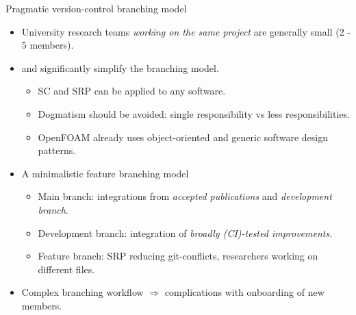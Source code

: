 \documentclass[
	ngerman,%
	aspectratio=169,%
	color={accentcolor=2d},
	logo=true,%
	colorframetitle=true,%
	]{tudabeamer}
\begin{document}
\begin{frame}{Pragmatic version-control branching model} 

	\vfill
	\begin{itemize}
		\item University research teams \emph{working on the same project} are generally small (2 - 5 members).
		\item \href{https://en.wikipedia.org/wiki/Separation_of_concerns}{} and \href{https://en.wikipedia.org/wiki/Single-responsibility_principle}{} significantly simplify the branching model. 
			\begin{itemize}
				\item SC and SRP can be applied to any software.
				\item Dogmatism should be avoided: single responsibility vs less responsibilities. 
				\item OpenFOAM already uses object-oriented and generic software design patterns.  
			\end{itemize}
		\item A minimalistic feature branching model 
			\begin{itemize}
				\item Main branch: integrations from \emph{accepted publications} and \emph{development branch}. 
				\item Development branch: integration of \emph{broadly (CI)-tested improvements}. 
				\item Feature branch: SRP reducing git-conflicts, researchers working on different files.
			\end{itemize}
		\item Complex branching workflow $\Rightarrow$ complications with onboarding of new members.
	\end{itemize}

\end{frame}
\end{document}
